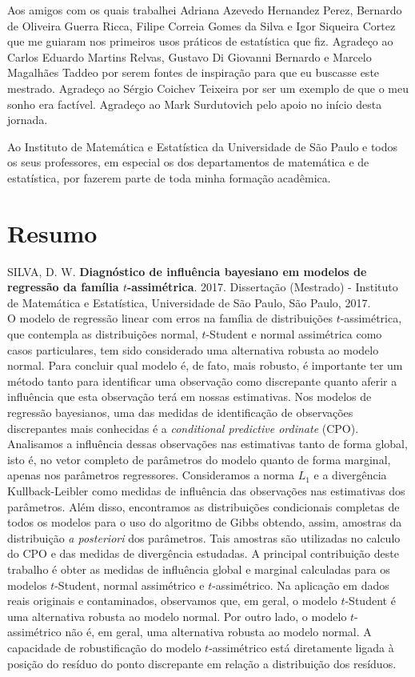 \documentclass[12pt,twoside,a4paper]{book}
\begin{document}
Aos amigos com os quais trabalhei Adriana Azevedo Hernandez Perez, Bernardo de Oliveira Guerra Ricca, Filipe Correia Gomes da Silva e Igor Siqueira Cortez que me guiaram nos primeiros usos práticos de estatística que fiz. Agradeço ao Carlos Eduardo Martins Relvas, Gustavo Di Giovanni Bernardo e Marcelo Magalhães Taddeo por serem fontes de inspiração para que eu buscasse este mestrado. Agradeço ao Sérgio Coichev Teixeira por ser um exemplo de que o meu sonho era factível. Agradeço ao Mark Surdutovich pelo apoio no início desta jornada.

Ao Instituto de Matemática e Estatística da Universidade de São Paulo e todos os seus professores, em especial os dos departamentos de matemática e de estatística, por fazerem parte de toda minha formação acadêmica.

\chapter*{Resumo}

\noindent SILVA, D. W. \textbf{Diagnóstico de influência bayesiano em modelos de regressão da família $t$-assimétrica}. 
2017. Dissertação (Mestrado) - Instituto de Matemática e Estatística,
Universidade de São Paulo, São Paulo, 2017.
\\

O modelo de regressão linear com erros na família de distribuições $t$-assimétrica, que contempla as distribuições normal, $t$-Student e normal assimétrica como casos particulares, tem sido considerado uma alternativa robusta ao modelo normal. Para concluir qual modelo é, de fato, mais robusto, é importante ter um método tanto para identificar uma observação como discrepante quanto aferir a influência que esta observação terá em nossas estimativas. Nos modelos de regressão bayesianos, uma das medidas de identificação de observações discrepantes mais conhecidas é a \textit{conditional predictive ordinate} (CPO). Analisamos a influência dessas observações nas estimativas tanto de forma global, isto é, no vetor completo de parâmetros do modelo quanto de forma marginal, apenas nos parâmetros regressores. Consideramos a norma $L_1$ e a divergência Kullback-Leibler como medidas de influência das observações nas estimativas dos parâmetros. Além disso, encontramos as distribuições condicionais completas de todos os modelos para o uso do algoritmo de Gibbs obtendo, assim, amostras da distribuição \textit{a posteriori} dos parâmetros.  Tais amostras são utilizadas no calculo do CPO e das medidas de divergência estudadas. A principal contribuição deste trabalho é obter as medidas de influência global e marginal calculadas para os modelos $t$-Student, normal assimétrico e $t$-assimétrico. Na aplicação em dados reais originais e contaminados, observamos que, em geral, o modelo $t$-Student é uma alternativa robusta ao modelo normal. Por outro lado, o modelo $t$-assimétrico não é, em geral, uma alternativa robusta ao modelo normal. A capacidade de robustificação do modelo $t$-assimétrico está diretamente ligada à posição do resíduo do ponto discrepante em relação a distribuição dos resíduos.
\\
\end{document}
